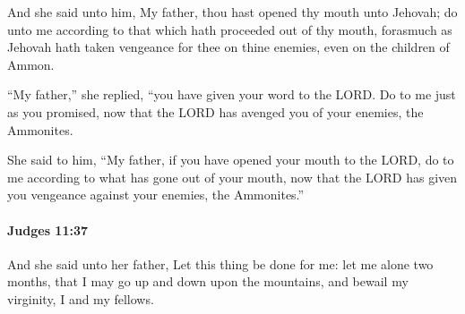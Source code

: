 			\begin{versebox}
					\item[BHS] 
					\item[ASV] And she said unto him, My father, thou hast opened thy mouth unto Jehovah; do unto me according to that which hath proceeded out of thy mouth, forasmuch as Jehovah hath taken vengeance for thee on thine enemies, even on the children of Ammon.
					\item[NIV] “My father,” she replied, “you have given your word to the LORD. Do to me just as you promised, now that the LORD has avenged you of your enemies, the Ammonites.
					\item[NRSV] She said to him, “My father, if you have opened your mouth to the LORD, do to me according to what has gone out of your mouth, now that the LORD has given you vengeance against your enemies, the Ammonites.”
			\end{versebox}

		\paragraph{Judges 11:37} %
			\label{JUDGES-11-37}

			And she said unto her father, Let this thing be done for me: let me alone two months, that I may go up and down upon the mountains, and bewail my virginity, I and my fellows.

